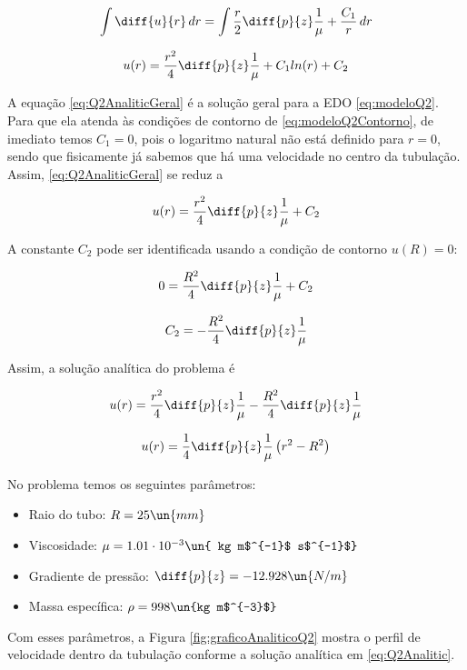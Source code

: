 \[ \int \diff{u}{r} \, dr = \int  \frac{r}{2} \diff{p}{z} \frac{1}{\mu} + \frac{C_1}{r} \, dr \]

\begin{equation}\label{eq:Q2AnaliticGeral}
    u(r) = \frac{r^2}{4} \diff{p}{z} \frac{1}{\mu} + C_1 ln (r) + C_2
\end{equation}

A equação \eqref{eq:Q2AnaliticGeral} é a solução geral para a EDO \eqref{eq:modeloQ2}.
Para que ela atenda às condições de contorno de \eqref{eq:modeloQ2Contorno}, de imediato
temos $C_1 = 0$, pois o logaritmo natural não está definido para $r = 0$,
sendo que fisicamente já sabemos que há uma velocidade no centro da tubulação. Assim,
\eqref{eq:Q2AnaliticGeral} se reduz a 

\[ u(r) = \frac{r^2}{4} \diff{p}{z} \frac{1}{\mu} + C_2 \]

A constante $C_2$ pode ser identificada usando a condição de contorno $u(R) = 0$:

\[ 0 = \frac{R^2}{4} \diff{p}{z} \frac{1}{\mu} + C_2 \]

\[ C_2 = - \frac{R^2}{4} \diff{p}{z} \frac{1}{\mu} \]

Assim, a solução analítica do problema é 

\[ u(r) = \frac{r^2}{4} \diff{p}{z} \frac{1}{\mu} - \frac{R^2}{4} \diff{p}{z} \frac{1}{\mu}  \]

\begin{equation}\label{eq:Q2Analitic}
    u(r) = \frac{1}{4} \diff{p}{z} \frac{1}{\mu} \left(r^2 - R^2\right) 
\end{equation}

No problema temos os seguintes parâmetros:

\begin{itemize}
    \item Raio do tubo: $R=25 \un{mm}$
    \item Viscosidade: $\mu=1.01 \cdot 10^{-3} \un{ kg m$^{-1}$ s$^{-1}$}$
    \item Gradiente de pressão: $\diff{p}{z}=-12.928 \un{N/m}$
    \item Massa específica: $\rho=998 \un{kg m$^{-3}$}$
\end{itemize}

Com esses parâmetros, a Figura \ref*{fig:graficoAnaliticoQ2} mostra o perfil
de velocidade dentro da tubulação conforme a solução analítica em
\eqref{eq:Q2Analitic}.

